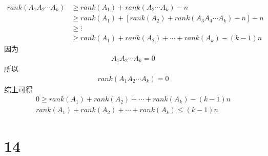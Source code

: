 \documentclass{article}
\begin{document}
\begin{align*}
  rank(A_1 A_2 \cdots A_k)
   & \geq rank(A_1) + rank(A_2 \cdots A_k) - n                       \\
   & \geq rank(A_1) + [rank(A_2) + rank(A_3 A_4 \cdots A_k) - n] - n \\
   & \geq \vdots                                                     \\
   & \geq rank(A_1) + rank(A_2) + \cdots + rank(A_k) - (k - 1)n
\end{align*}
因为
\begin{align*}
  A_1 A_2 \cdots A_k = 0
\end{align*}
所以
\begin{align*}
  rank(A_1 A_2 \cdots A_k) = 0
\end{align*}
综上可得
\begin{align*}
  0 \geq rank(A_1) + rank(A_2) + \cdots + rank(A_k) - (k - 1)n \\
  rank(A_1) + rank(A_2) + \cdots + rank(A_k) \leq (k - 1)n
\end{align*}

\section*{14}
\end{document}
